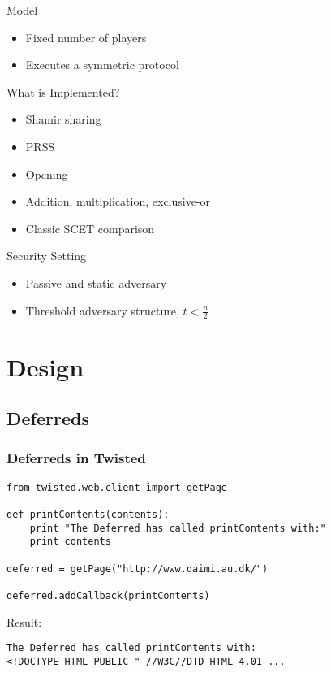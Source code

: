 \documentclass[t,noamsthm]{beamer}
\begin{document}
\begin{frame}{Model}
  \begin{itemize}
  \item Fixed number of players
  \item Executes a symmetric protocol
  \end{itemize}
\end{frame}

\begin{frame}{What is Implemented?}
  \begin{itemize}
  \item Shamir sharing
  \item PRSS
  \item Opening
  \item Addition, multiplication, exclusive-or
  \item Classic SCET comparison
  \end{itemize}
\end{frame}

\begin{frame}{Security Setting}
  \begin{itemize}
  \item Passive and static adversary
  \item Threshold adversary structure, $t < \frac n 2$
  \end{itemize}
\end{frame}


\section{Design}

\subsection{Deferreds}

\begin{frame}[fragile]

\frametitle{Deferreds in Twisted}

\begin{lstlisting}
from twisted.web.client import getPage

def printContents(contents):
    print "The Deferred has called printContents with:"
    print contents

deferred = getPage("http://www.daimi.au.dk/")

deferred.addCallback(printContents)
\end{lstlisting}

Result:
\begin{lstlisting}[language={}]
The Deferred has called printContents with:
<!DOCTYPE HTML PUBLIC "-//W3C//DTD HTML 4.01 ...
\end{lstlisting}

\end{frame}
\end{document}
